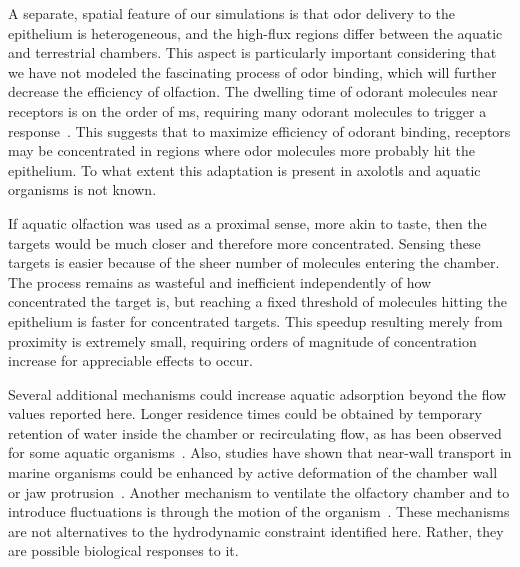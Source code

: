 \documentclass[%
 twocolumn,
 amsmath,amssymb,
 aps,prfluids,
 superscriptaddress,
]{revtex4-2}
\begin{document}
A separate, spatial feature of our simulations is that odor delivery to the epithelium is heterogeneous, and the high-flux regions differ between the aquatic and terrestrial chambers. This aspect is particularly important considering that we have not modeled the fascinating process of odor binding, which will further decrease the efficiency of olfaction. The dwelling time of odorant molecules near receptors is on the order of ms, requiring many odorant molecules to trigger a response~\cite{bhandawat2005elementary}. This suggests that to maximize efficiency of odorant binding, receptors may be concentrated in regions where odor molecules more probably hit the epithelium. To what extent this adaptation is present in axolotls and aquatic organisms is not known.

If aquatic olfaction was used as a proximal sense, more akin to taste, then the targets would be much closer and therefore more concentrated. Sensing these targets is easier because of the sheer number of molecules entering the chamber. The process remains as wasteful and inefficient independently of how concentrated the target is, but reaching a fixed threshold of molecules hitting the epithelium is faster for concentrated targets. This speedup resulting merely from proximity is extremely small, requiring orders of magnitude of concentration increase for appreciable effects to occur.

Several additional mechanisms could increase aquatic adsorption beyond the flow values reported here. Longer residence times could be obtained by temporary retention of water inside the chamber or recirculating flow, as has been observed for some aquatic organisms~\cite{cox2008hydrodynamic}. Also, studies have shown that near-wall transport in marine organisms could be enhanced by active deformation of the chamber wall or jaw protrusion~\cite{cox2008hydrodynamic,nevitt1991fish}. Another mechanism to ventilate the olfactory chamber and to introduce fluctuations is through the motion of the organism~\cite{garwood2019olfactory}. These mechanisms are not alternatives to the hydrodynamic constraint identified here. Rather, they are possible biological responses to it.
\end{document}
